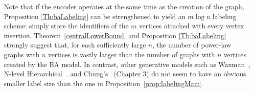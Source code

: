 Note that if the encoder operates at the same time as the creation of the graph, Proposition \ref{Th:baLabeling} can be strengthened to yield  an $m \log n$ labeling scheme: simply store the  
 identifiers of the $m$ vertices attached with every vertex insertion.
Theorem~\ref{centralLowerBound} and Proposition \ref{Th:baLabeling} strongly suggest that, for each sufficiently large $n$, the number of  power-law graphs with $n$ vertices  is vastly larger than the number of graphs with $n$ vertices created by the  BA model.  In contrast, other generative models such as   Waxman~\cite{waxman1988routing}, N-level Hierarchical~\cite{calvert1997modeling}.
and Chung's~\cite{chung2006complex} (Chapter 3)  do not seem to have an obvious smaller label size than the one in Proposition~\ref{prop:labelingMain}.
